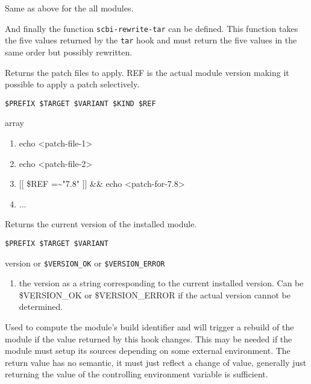 \documentclass[a4paper,12pt,twoside]{article}
\newcommand{\code}[1]{\texttt{#1}}
\begin{document}
\begin{description}[font=\large\texttt]
\begin{description}[style=standard]
		\item[\code{SCBI\_TAR\_VARIANT}] Same as above for the all modules.
	\end{description}

	And finally the function \code{scbi-rewrite-tar} can be defined. This function takes the five values returned by the \code{tar} hook and must return the five values in the same order but possibly rewritten.

	\item[<module>{[}-common|<variant>{]}-patches] Returns the patch files to apply. REF is the actual module version making it possible to apply a patch selectively.

	\begin{description}[font=\textit,style=standard]
		\item[parameter] \tabto{2cm} \code{\$PREFIX \$TARGET \$VARIANT \$KIND \$REF}
		\item[return] \tabto{2cm} array
		\begin{enumerate}
			\item echo <patch-file-1>
			\item echo <patch-file-2>
			\item {[}{[} \$REF =\textasciitilde "7.8" {]}{]} \&\& echo <patch-for-7.8>
			\item ...
		\end{enumerate}
	\end{description}

	\item[<module>{[}-<variant>{]}-version] Returns the current version of the installed module.
	\begin{description}[font=\textit,style=standard]
		\item[parameter] \tabto{2cm} \code{\$PREFIX \$TARGET \$VARIANT}
		\item[return] \tabto{2cm} version or \code{\$VERSION\_OK} or \code{\$VERSION\_ERROR}
		\begin{enumerate}
			\item the version as a string corresponding to the current installed version. Can be \$VERSION\_OK or \$VERSION\_ERROR if the actual version cannot be determined.
		\end{enumerate}
	\end{description}

	\item[<module>{[}-common|<variant>{]}-external-env] Used to compute the module's build identifier and will trigger a rebuild of the module if the value returned by this hook changes. This may be needed if the module must setup its sources depending on some external environment. The return value has no semantic, it must just reflect a change of value, generally just returning the value of the controlling environment variable is sufficient.


\end{description}
\end{document}
